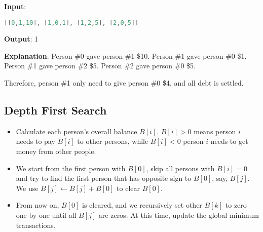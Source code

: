 \begin{flushleft}
\textbf{Input}:

\lstinline[language=C++, basicstyle=\small\ttfamily, keywordstyle=\bfseries\color{green!40!black}]|[[0,1,10], [1,0,1], [1,2,5], [2,0,5]]|

\textbf{Output}: 1

\textbf{Explanation}:
Person \#0 gave person \#1 \$10.
Person \#1 gave person \#0 \$1.
Person \#1 gave person \#2 \$5.
Person \#2 gave person \#0 \$5.

Therefore, person \#1 only need to give person \#0 \$4, and all debt is settled.
\end{flushleft}

\subsection{Depth First Search}
\begin{itemize}
\item Calculate each person's overall balance $B[i]$. $B[i]>0$ means person $i$ needs to pay $B[i]$ to other persons, while $B[i]<0$ person $i$ needs to get money from other people. 
\item We start from the first person with $B[0]$, skip all persons with $B[i]=0$ and try to find the first person that has opposite sign to $B[0]$, say, $B[j]$. We use $B[j]\gets B[j]+B[0]$ to clear $B[0]$.
\item From now on, $B[0]$ is cleared, and we recursively set other $B[k]$ to zero one by one until all $B[j]$ are zeros. At this time, update the global minimum transactions.
\end{itemize}


